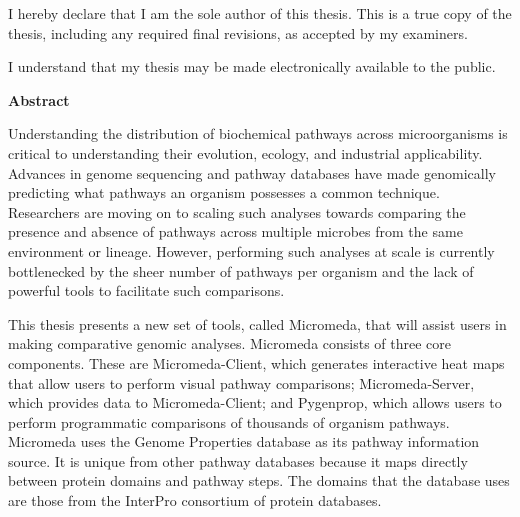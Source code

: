 \cleardoublepage %

  \noindent
I hereby declare that I am the sole author of this thesis. This is a true copy of the thesis, including any required final revisions, as accepted by my examiners.

  \bigskip
  
  \noindent
I understand that my thesis may be made electronically available to the public.

\cleardoublepage


\begin{center}\textbf{Abstract}\end{center}

Understanding the distribution of biochemical pathways across microorganisms is critical to understanding their evolution, ecology, and industrial applicability. Advances in genome sequencing and pathway databases have made genomically predicting what pathways an organism possesses a common technique. Researchers are moving on to scaling such analyses towards comparing the presence and absence of pathways across multiple microbes from the same environment or lineage. However, performing such analyses at scale is currently bottlenecked by the sheer number of pathways per organism and the lack of powerful tools to facilitate such comparisons. 

This thesis presents a new set of tools, called Micromeda, that will assist users in making comparative genomic analyses. Micromeda consists of three core components. These are Micromeda-Client, which generates interactive heat maps that allow users to perform visual pathway comparisons; Micromeda-Server, which provides data to Micromeda-Client; and Pygenprop, which allows users to perform programmatic comparisons of thousands of organism pathways. Micromeda uses the Genome Properties database as its pathway information source. It is unique from other pathway databases because it maps directly between protein domains and pathway steps. The domains that the database uses are those from the InterPro consortium of protein databases. 

